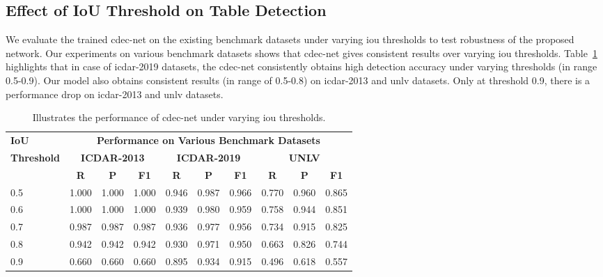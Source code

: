 \documentclass[a4paper,conference]{IEEEtran}
\begin{document}
\subsection{Effect of IoU Threshold on Table Detection}

We evaluate the trained {\sc cd}e{\sc c-n}et on the existing benchmark datasets under varying {\sc i}o{\sc u} thresholds to test robustness of the proposed network. Our experiments on various benchmark datasets shows that {\sc cd}e{\sc c-n}et gives consistent results over varying {\sc i}o{\sc u} thresholds. Table~\ref{table_iou_threshold} highlights that in case of {\sc icdar-2019} datasets, the {\sc cd}e{\sc c-n}et consistently obtains high detection accuracy under varying thresholds (in range 0.5-0.9). Our model also obtains consistent results (in range of 0.5-0.8) on {\sc icdar-2013} and {\sc unlv} datasets. Only at threshold 0.9, there is a performance drop on {\sc icdar-2013} and {\sc unlv} datasets. 



\begin{table}[ht!]
\addtolength{\tabcolsep}{-3.5pt}
\begin{center}
\begin{tabular}{|l|c c c|c c c|c c c|} \hline
\textbf{IoU} &\multicolumn{9}{c|}{\textbf{Performance on Various Benchmark Datasets}} \\ \cline{2-10}
\textbf{Threshold}  &\multicolumn{3}{c|}{\textbf{ICDAR-2013}} &\multicolumn{3}{c|}{\textbf{ICDAR-2019}}  &\multicolumn{3}{c|}{\textbf{UNLV}}  \\ \cline{2-10}   
 &\textbf{R} &\textbf{P} &\textbf{F1} &\textbf{R} &\textbf{P} &\textbf{F1} &\textbf{R} &\textbf{P} &\textbf{F1} \\ \hline
0.5 &1.000 &1.000 &1.000 &0.946 &0.987 &0.966 &0.770 &0.960 &0.865 \\
0.6 &1.000 &1.000 &1.000 &0.939 &0.980 &0.959 &0.758 &0.944 &0.851 \\ 
0.7 &0.987 &0.987 &0.987 &0.936 &0.977 &0.956 &0.734 &0.915 &0.825 \\
0.8 &0.942 &0.942 &0.942 &0.930 &0.971 &0.950 &0.663 &0.826 &0.744 \\
0.9 &0.660 &0.660 &0.660 &0.895 &0.934 &0.915 &0.496 &0.618 &0.557 \\ \hline
\end{tabular}
\end{center}
\caption{Illustrates the performance of {\sc cd}e{\sc c-n}et under varying {\sc i}o{\sc u} thresholds. \label{table_iou_threshold}}
\end{table}
\end{document}
